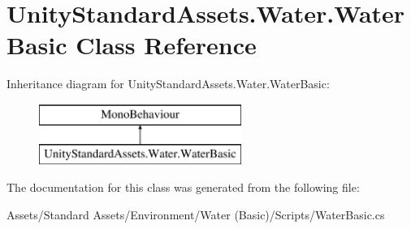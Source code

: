 \hypertarget{class_unity_standard_assets_1_1_water_1_1_water_basic}{}\section{Unity\+Standard\+Assets.\+Water.\+Water\+Basic Class Reference}
\label{class_unity_standard_assets_1_1_water_1_1_water_basic}
Inheritance diagram for Unity\+Standard\+Assets.\+Water.\+Water\+Basic\+:\begin{figure}[H]
\begin{center}
\leavevmode
\includegraphics[height=2.000000cm]{class_unity_standard_assets_1_1_water_1_1_water_basic}
\end{center}
\end{figure}


The documentation for this class was generated from the following file\+:\begin{DoxyCompactItemize}
\item 
Assets/\+Standard Assets/\+Environment/\+Water (\+Basic)/\+Scripts/Water\+Basic.\+cs\end{DoxyCompactItemize}
